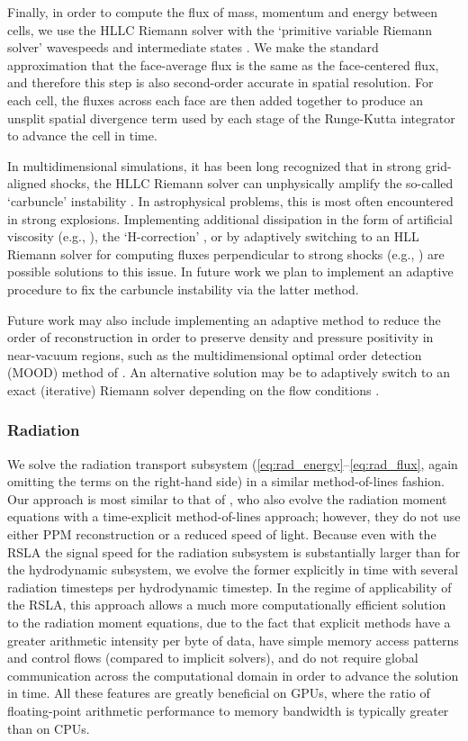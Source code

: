 \documentclass[fleqn,usenatbib]{mnras}
\begin{document}
Finally, in order to compute the flux of mass, momentum and energy between cells, we use the HLLC Riemann solver with the `primitive variable Riemann solver' wavespeeds and intermediate states \citep{Toro_2013}. We make the standard approximation that the face-average flux is the same as the face-centered flux, and therefore this step is also second-order accurate in spatial resolution. For each cell, the fluxes across each face are then added together to produce an unsplit spatial divergence term used by each stage of the Runge-Kutta integrator to advance the cell in time.

In multidimensional simulations, it has been long recognized that in strong grid-aligned shocks, the HLLC Riemann solver can unphysically amplify the so-called `carbuncle' instability \citep{Quirk_1994}. In astrophysical problems, this is most often encountered in strong explosions. Implementing additional dissipation in the form of artificial viscosity (e.g., \citealt{Gittings_2008}), the `H-correction' \citep{Sanders_1998}, or by adaptively switching to an HLL Riemann solver \citep{Harten_1983} for computing fluxes perpendicular to strong shocks (e.g., \citealt{Quirk_1994,Skinner_2019}) are possible solutions to this issue. In future work we plan to implement an adaptive procedure to fix the carbuncle instability via the latter method.

Future work may also include implementing an adaptive method to reduce the order of reconstruction in order to preserve density and pressure positivity in near-vacuum regions, such as the multidimensional optimal order detection (MOOD) method of \cite{Clain_2011}. An alternative solution may be to adaptively switch to an exact (iterative) Riemann solver depending on the flow conditions \citep{Toro_2013}.

\subsubsection{Radiation}
\label{sssec:radiation}

We solve the radiation transport subsystem (\autoref{eq:rad_energy}--\autoref{eq:rad_flux}, again omitting the terms on the right-hand side) in a similar method-of-lines fashion. Our approach is most similar to that of \cite{Skinner_2019}, who also evolve the radiation moment equations with a time-explicit method-of-lines approach; however, they do not use either PPM reconstruction or a reduced speed of light. Because even with the RSLA the signal speed for the radiation subsystem is substantially larger than for the hydrodynamic subsystem, we evolve the former explicitly in time with several radiation timesteps per hydrodynamic timestep. In the regime of applicability of the RSLA, this approach allows a much more computationally efficient solution to the radiation moment equations, due to the fact that explicit methods have a greater arithmetic intensity per byte of data, have simple memory access patterns and control flows (compared to implicit solvers), and do not require global communication across the computational domain in order to advance the solution in time. All these features are greatly beneficial on GPUs, where the ratio of floating-point arithmetic performance to memory bandwidth is typically greater than on CPUs.
\end{document}
